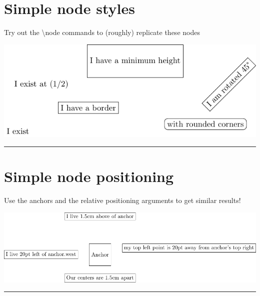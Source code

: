 \documentclass[12pt]{article}
\begin{document}
\section*{Simple node styles}

Try out the \textbackslash{}node commands to (roughly) replicate these nodes
\vspace{1em}

\includegraphics{_img_src/00_simple_node.pdf}

\vspace{1em}
\hrule 
\vspace{1em}

\begin{tikzpicture}
    
\end{tikzpicture}


\pagebreak
\section{Simple node positioning}

Use the anchors and the relative positioning arguments to get similar results!
\vspace{1em}

\includegraphics{_img_src/01_node_positioning.pdf}

\vspace{1em}
\hrule 
\vspace{1em}

\begin{tikzpicture}
    
\end{tikzpicture}
\end{document}
